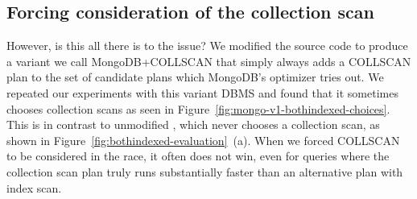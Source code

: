 \subsection{Forcing consideration of the collection scan}
However, is this all there is to the issue? We modified the source code to produce a variant we call MongoDB+COLLSCAN that simply always adds a COLLSCAN plan to the set of candidate plans which MongoDB's \approachName optimizer tries out. We repeated our experiments with this variant DBMS and found that it sometimes chooses collection scans as seen in Figure~\ref{fig:mongo-v1-bothindexed-choices}. This is in contrast to  unmodified \relname, which never chooses a collection scan, as shown in Figure~\ref{fig:bothindexed-evaluation}~(a). When we forced COLLSCAN to be considered in the \approachName race, it often does not win, even for queries where the collection scan plan truly runs substantially faster than an alternative plan with index scan.

